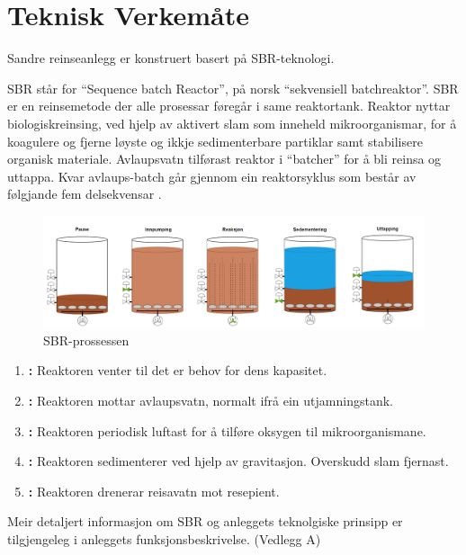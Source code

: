 \newpage
\section{Teknisk Verkemåte}
\thispagestyle{fancy}
Sandre reinseanlegg er konstruert basert på \gls{SBR}-teknologi.

\gls{SBR} står for ``Sequence \Gls{batch} Reactor'', på norsk ``sekvensiell \gls{batch}reaktor''.\newline
\gls{SBR} er en reinsemetode der alle prosessar føregår i same reaktortank. 
Reaktor nyttar biologiskreinsing, ved hjelp av aktivert slam som inneheld mikroorganismar, for å koagulere 
og fjerne løyste og ikkje sedimenterbare partiklar samt stabilisere organisk materiale. 
Avlaupsvatn tilførast reaktor i ``batcher'' for å bli reinsa og uttappa. 
Kvar avlaups-batch går gjennom ein reaktorsyklus som består av følgjande fem delsekvensar \citep{Statsforvalter}.
\newline

\begin{figure}[htbp]
    \centering
    \includegraphics[width=1\textwidth]{Figurar/SBR-V2.png}
    \caption{\gls{SBR}-prossessen}\label{fig:SBR-Prosessen}
\end{figure}


\begin{enumerate}
    \item \textbf{:} Reaktoren venter til det er behov for dens kapasitet.
    \item \textbf{:} Reaktoren mottar avlaupsvatn, normalt ifrå ein utjamningstank.
    \item \textbf{:} Reaktoren periodisk luftast for å tilføre oksygen til mikroorganismane.
    \item \textbf{:} Reaktoren sedimenterer ved hjelp av gravitasjon. Overskudd slam fjernast.
    \item \textbf{:} Reaktoren drenerar reisavatn mot resepient.
\end{enumerate}

Meir detaljert informasjon om \gls{SBR} og anleggets teknolgiske prinsipp er tilgjengeleg i anleggets
funksjonsbeskrivelse. (Vedlegg A)

